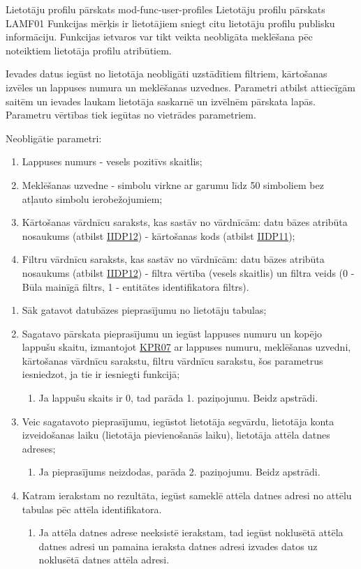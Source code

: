\moduleFunctionTable
{Lietotāju profilu pārskats}
{mod-func-user-profiles}
{Lietotāju profilu pārskats}
{LAMF01}
{
	Funkcijas mērķis ir lietotājiem sniegt citu lietotāju profilu publisku informāciju. Funkcijas ietvaros var tikt veikta neobligāta meklēšana pēc noteiktiem lietotāja profilu atribūtiem.
}
{
	Ievades datus iegūst no lietotāja neobligāti uzstādītiem filtriem, kārtošanas izvēles un lappuses numura un meklēšanas uzvednes.
	Parametri atbilst attiecīgām saitēm un ievades laukam lietotāja saskarnē un izvēlnēm pārskata lapās.
	Parametru vērtības tiek iegūtas no vietrādes parametriem.

	Neobligātie parametri:
	\begin{enumerate}
		\item Lappuses numurs - vesels pozitīvs skaitlis;
		\item Meklēšanas uzvedne - simbolu virkne ar garumu līdz 50 simboliem bez atļauto simbolu ierobežojumiem;
		\item Kārtošanas vārdnīcu saraksts, kas sastāv no vārdnīcām: datu bāzes atribūta nosaukums (atbilst \hyperref[tab:IIDP12]{IIDP12}) - kārtošanas kods (atbilst \hyperref[tab:IIDP11]{IIDP11});
		\item Filtru vārdnīcu saraksts, kas sastāv no vārdnīcām: datu bāzes atribūta nosaukums (atbilst \hyperref[tab:IIDP12]{IIDP12}) - filtra vērtība (vesels skaitlis) un filtra veids (0 - Būla mainīgā filtrs, 1 - entitātes identifikatora filtrs).
	\end{enumerate}
}
{
	\begin{enumerate}
		\item Sāk gatavot datubāzes pieprasījumu no lietotāju tabulas;
		\item Sagatavo pārskata pieprasījumu un iegūst lappuses numuru un kopējo lappušu skaitu, izmantojot \hyperref[tab:KPR07]{KPR07} ar lappuses numuru, meklēšanas uzvedni, kārtošanas vārdnīcu sarakstu, filtru vārdnīcu sarakstu, šos parametrus iesniedzot, ja tie ir iesniegti funkcijā;
		      \begin{enumerate}
			      \item Ja lappušu skaits ir 0, tad parāda 1. paziņojumu. Beidz apstrādi.
		      \end{enumerate}
		\item Veic sagatavoto pieprasījumu, iegūstot lietotāja segvārdu, lietotāja konta izveidošanas laiku (lietotāja pievienošanās laiku), lietotāja attēla datnes adreses;
		      \begin{enumerate}
			      \item Ja pieprasījums neizdodas, parāda 2. paziņojumu. Beidz apstrādi.
		      \end{enumerate}
		\item Katram ierakstam no rezultāta, iegūst sameklē attēla datnes adresi no attēlu tabulas pēc attēla identifikatora.
		      \begin{enumerate}
			      \item Ja attēla datnes adrese neeksistē ierakstam, tad iegūst noklusētā attēla datnes adresi un pamaina ieraksta datnes adresi izvades datos uz noklusētā datnes attēla adresi.
		      \end{enumerate}
	\end{enumerate}
}
